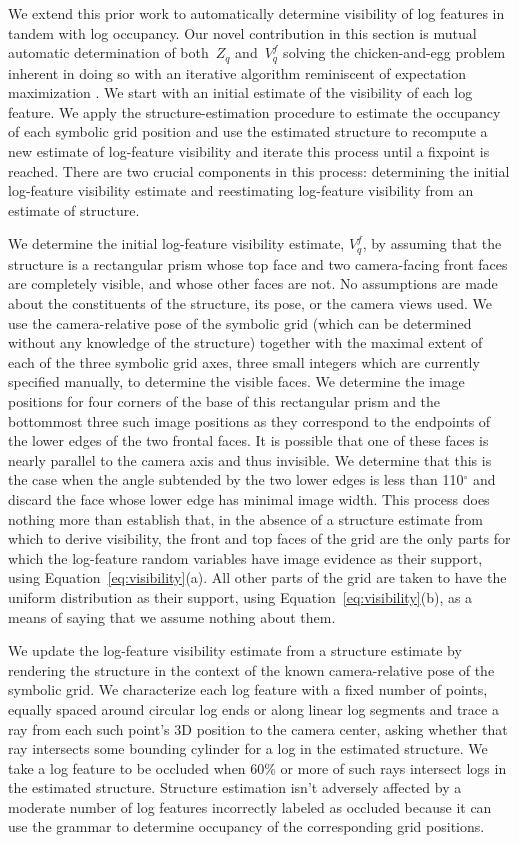 We extend this prior work to automatically determine visibility of log features
in tandem with log occupancy.
%
Our novel contribution in this section is mutual automatic determination of
both~$Z_q$ and~$V^f_q$ solving the chicken-and-egg problem inherent in doing so
with an iterative algorithm reminiscent of expectation maximization
\cite{DempsterLR77}.
%
We start with an initial estimate of the visibility of each log feature.
%
We apply the structure-estimation procedure to estimate the occupancy of each
symbolic grid position and use the estimated structure to recompute a new
estimate of log-feature visibility and iterate this process until a fixpoint is
reached.
%
There are two crucial components in this process: determining the initial
log-feature visibility estimate and reestimating log-feature visibility from an
estimate of structure.

We determine the initial log-feature visibility estimate, $V^f_q$, by assuming
that the structure is a rectangular prism whose top face and two camera-facing
front faces are completely visible, and whose other faces are not.
%
No assumptions are made about the constituents of the structure, its pose, or
the camera views used.
%
We use the camera-relative pose of the symbolic grid (which can be determined
without any knowledge of the structure) together with the maximal extent of
each of the three symbolic grid axes, three small integers which are currently
specified manually, to determine the visible faces.
%
We determine the image positions for four corners of the base of this
rectangular prism and the bottommost three such image positions as they
correspond to the endpoints of the lower edges of the two frontal faces.
%
It is possible that one of these faces is nearly parallel to the
camera axis and thus invisible.
%
We determine that this is the case when the angle subtended by the two lower
edges is less than 110$^{\circ}$ and discard the face whose lower edge has
minimal image width.
%
This process does nothing more than establish that, in the absence of a
structure estimate from which to derive visibility, the front and top faces of
the grid are the only parts for which the log-feature random variables have
image evidence as their support, using Equation~\ref{eq:visibility}(a).
%
All other parts of the grid are taken to have the uniform distribution as their
support, using Equation~\ref{eq:visibility}(b), as a means of saying that we
assume nothing about them.

We update the log-feature visibility estimate from a structure estimate by
rendering the structure in the context of the known camera-relative pose of the
symbolic grid.
%
We characterize each log feature with a fixed number of points, equally spaced
around circular log ends or along linear log segments and trace a ray from each
such point's 3D position to the camera center, asking whether that ray
intersects some bounding cylinder for a log in the estimated structure.
%
We take a log feature to be occluded when 60\% or more of such rays intersect
logs in the estimated structure.
%
Structure estimation isn't adversely affected by a moderate number of log
features incorrectly labeled as occluded because it can use the grammar to
determine occupancy of the corresponding grid positions.

